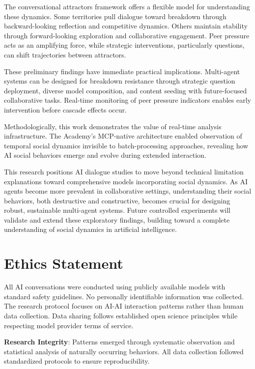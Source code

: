 \documentclass[11pt,letterpaper]{article}
\newcommand{\theacademy}{The Academy}
\begin{document}
The conversational attractors framework offers a flexible model for understanding these dynamics. Some territories pull dialogue toward breakdown through backward-looking reflection and competitive dynamics. Others maintain stability through forward-looking exploration and collaborative engagement. Peer pressure acts as an amplifying force, while strategic interventions, particularly questions, can shift trajectories between attractors.

These preliminary findings have immediate practical implications. Multi-agent systems can be designed for breakdown resistance through strategic question deployment, diverse model composition, and content seeding with future-focused collaborative tasks. Real-time monitoring of peer pressure indicators enables early intervention before cascade effects occur.

Methodologically, this work demonstrates the value of real-time analysis infrastructure. \theacademy{}'s MCP-native architecture enabled observation of temporal social dynamics invisible to batch-processing approaches, revealing how AI social behaviors emerge and evolve during extended interaction.

This research positions AI dialogue studies to move beyond technical limitation explanations toward comprehensive models incorporating social dynamics. As AI agents become more prevalent in collaborative settings, understanding their social behaviors, both destructive and constructive, becomes crucial for designing robust, sustainable multi-agent systems. Future controlled experiments will validate and extend these exploratory findings, building toward a complete understanding of social dynamics in artificial intelligence.

\section*{Ethics Statement}

All AI conversations were conducted using publicly available models with standard safety guidelines. No personally identifiable information was collected. The research protocol focuses on AI-AI interaction patterns rather than human data collection. Data sharing follows established open science principles while respecting model provider terms of service.

\textbf{Research Integrity}: Patterns emerged through systematic observation and statistical analysis of naturally occurring behaviors. All data collection followed standardized protocols to ensure reproducibility.
\end{document}
